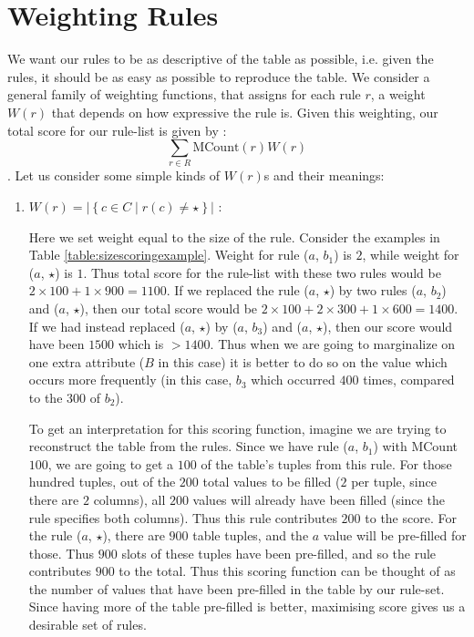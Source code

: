 \documentclass{sig-alternate}
\begin{document}
\section{Weighting Rules}
\label{sec:weighting}
We want our rules to be as descriptive of the table as possible, i.e. given the rules, it should be as easy as possible to reproduce the table. We consider a general family of weighting functions, that assigns for each rule $r$, a weight $W(r)$ that depends on how expressive the rule is. Given this weighting, our total score for our rule-list is given by : $$\sum_{r\in R} \text{MCount}(r)W(r)$$. Let us consider some simple kinds of $W(r)$s and their meanings:
\begin{enumerate}
\item $W(r) = |\left\lbrace c \in C \mid r(c) \neq \star \right\rbrace |$ : 

Here we set weight equal to the size of the rule. Consider the examples in Table \ref{table:sizescoringexample}. Weight for rule ($a$, $b_1$) is $2$, while weight for ($a$, $\star$) is $1$. Thus total score for the rule-list with these two rules would be $2 \times 100 + 1 \times 900 = 1100$. If we replaced the rule ($a$, $\star$) by two rules ($a$, $b_2$) and ($a$, $\star$), then our total score would be $2 \times 100 + 2 \times 300 + 1 \times 600 = 1400$. If we had instead replaced ($a$, $\star$) by ($a$, $b_3$) and ($a$, $\star$), then our score would have been $1500$ which is $> 1400$. Thus when we are going to marginalize on one extra attribute ($B$ in this case) it is better to do so on the value which occurs more frequently (in this case, $b_3$ which occurred $400$ times, compared to the $300$ of $b_2$). 

To get an interpretation for this scoring function, imagine we are trying to reconstruct the table from the rules. Since we have rule ($a$, $b_1$) with MCount $100$, we are going to get a $100$ of the table's tuples from this rule. For those hundred tuples, out of the $200$ total values to be filled ($2$ per tuple, since there are $2$ columns), all $200$ values will already have been filled (since the rule specifies both columns). Thus this rule contributes $200$ to the score. For the rule ($a$, $\star$), there are $900$ table tuples, and the $a$ value will be pre-filled for those. Thus $900$ slots of these tuples have been pre-filled, and so the rule contributes $900$ to the total. Thus this scoring function can be thought of as the number of values that have been pre-filled in the table by our rule-set. Since having more of the table pre-filled is better, maximising score gives us a desirable set of rules.


\end{enumerate}
\end{document}
